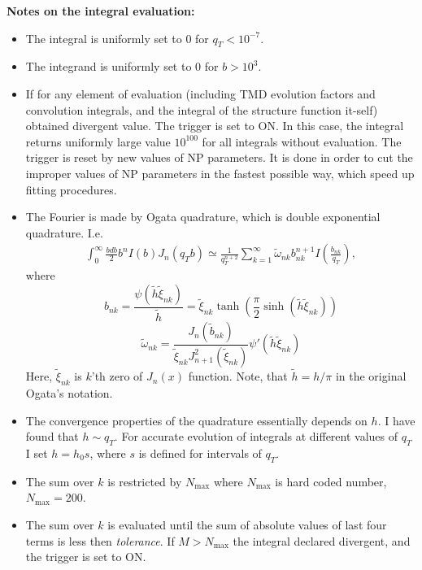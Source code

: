 \documentclass[prd,nofootinbib,eqsecnum,final]{revtex4}
\renewcommand{\(}{\left(}
\renewcommand{\)}{\right)}
\renewcommand{\[}{\left[}
\renewcommand{\]}{\right]}
\begin{document}
\textbf{Notes on the integral evaluation:}
\begin{itemize}
\item The integral is uniformly set to 0 for $q_T<10^{-7}$.
\item The integrand is uniformly set to 0 for $b>10^{3}$.
\item If for any element of evaluation (including TMD evolution factors and convolution integrals, and the integral of the structure function it-self) obtained divergent value. The trigger is set to ON. In this case, the integral returns uniformly large value $10^{100}$ for all integrals without evaluation. The trigger is reset by new values of NP parameters. It is done in order to cut the improper values of NP parameters in the fastest possible way, which speed up fitting procedures.
\item The Fourier is made by Ogata quadrature, which is double exponential quadrature. I.e.
\begin{eqnarray}
\int_0^\infty \frac{bdb}{2} b^n I(b) J_n(q_Tb)\simeq \frac{1}{q_T^{n+2}}\sum_{k=1}^\infty \tilde \omega_{nk} b_{nk}^{n+1} I\(\frac{b_{nk}}{q_T}\),
\end{eqnarray}
where
$$
b_{nk}=\frac{\psi(\tilde h \tilde \xi_{nk})}{\tilde h}=\tilde \xi_{nk} \tanh(\frac{\pi}{2}\sinh(\tilde h \tilde \xi_{nk}))
$$
$$
\tilde \omega_{nk}=\frac{J_n(\tilde b_{nk})}{\tilde\xi_{nk} J^2_{n+1}(\tilde \xi_{nk})}\psi'(\tilde h \tilde \xi_{nk})
$$
Here, $\tilde \xi_{nk}$ is $k$'th zero of $J_n(x)$ function. Note, that $\tilde h=h/\pi$ in the original Ogata's notation.
\item The convergence properties of the quadrature essentially depends on $h$. I have found that $h\sim q_T$. For accurate evolution of integrals at different values of $q_T$ I set $h=h_0 s$, where $s$ is defined for intervals of $q_T$.
\item The sum over $k$ is restricted by $N_{\text{max}}$ where $N_{\text{max}}$ is hard coded number, $N_{\text{max}}=200$. 
\item The sum over $k$ is evaluated until the sum of absolute values of last four terms is less then \textit{tolerance}. If $M>N_{\text{max}}$ the integral declared divergent, and the trigger is set to ON.
\end{itemize}
\end{document}
